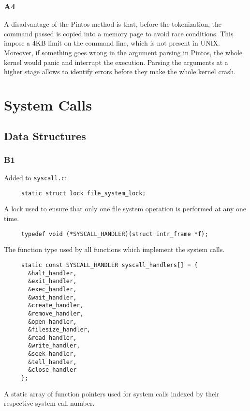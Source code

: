 \documentclass[a4wide, 11pt]{article}
\newcommand{\tab}{\hspace*{2em}}
\newcommand{\tx}{\texttt}
\begin{document}
\subsubsection{A4}
A disadvantage of the Pintos method is that, before the tokenization, the command passed is copied into a memory page to avoid race conditions. This impose a 4KB limit on the command line, which is not present in UNIX. \\
Moreover, if something goes wrong  in the argument parsing in Pintos, the whole kernel would panic and interrupt the execution. Parsing the arguments at a higher stage allows to identify errors before they make the whole kernel crash.

\section{System Calls}
\subsection{Data Structures}
\subsubsection{B1}

Added to \tx{syscall.c}:

\begin{verbatim}
     static struct lock file_system_lock;
\end{verbatim}

\tab A lock used to ensure that only one file system operation is performed at any one time.

\begin{verbatim}
     typedef void (*SYSCALL_HANDLER)(struct intr_frame *f);
\end{verbatim}

\tab The function type used by all functions which implement the system calls.

\begin{verbatim}
     static const SYSCALL_HANDLER syscall_handlers[] = {
       &halt_handler,
       &exit_handler,
       &exec_handler,
       &wait_handler,
       &create_handler,
       &remove_handler,
       &open_handler,
       &filesize_handler,
       &read_handler,
       &write_handler,
       &seek_handler,
       &tell_handler,
       &close_handler
     };
\end{verbatim}

\tab A static array of function pointers used for system calls indexed by their respective system call number.
\end{document}
